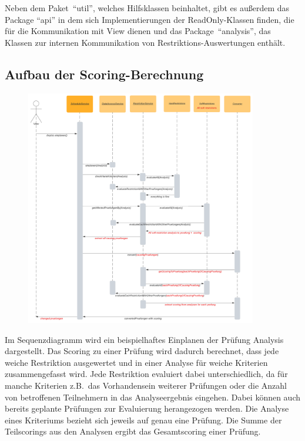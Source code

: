 Neben dem Paket~\enquote{util}, welches Hilfsklassen beinhaltet, gibt es außerdem das Package \enquote{api}
in dem sich Implementierungen der ReadOnly-Klassen finden, die für die Kommunikation mit View dienen
und das Package~\enquote{analysis}, das Klassen zur internen Kommunikation von Restriktions-Auswertungen enthält.
\pagebreak
\subsection{Aufbau der Scoring-Berechnung}\label{subsec:aufbau-der-scoring-berechnung}
\begin{figure}[!h]
    \includegraphics[width=0.9\textwidth]{extra/Sequence_diagram}\label{fig:figure}
\end{figure}

Im Sequenzdiagramm wird ein beispielhaftes Einplanen der Prüfung Analysis dargestellt.
Das Scoring zu einer Prüfung wird dadurch berechnet, dass jede weiche Restriktion ausgewertet und in
einer Analyse für weiche Kriterien zusammengefasst wird.
Jede Restriktion evaluiert dabei unterschiedlich, da für manche Kriterien z.B.\ das Vorhandensein weiterer
Prüfungen oder die Anzahl von betroffenen Teilnehmern in das Analyseergebnis eingehen.
Dabei können auch bereits geplante Prüfungen zur Evaluierung herangezogen werden.
Die Analyse eines Kriteriums bezieht sich jeweils auf genau eine Prüfung.
Die Summe der Teilscorings aus den Analysen ergibt das Gesamtscoring einer Prüfung.
